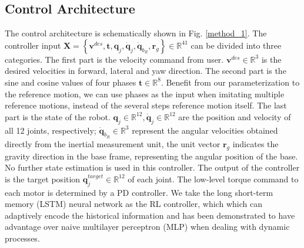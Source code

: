 \documentclass[letterpaper, 10 pt, journal, twoside]{IEEEtran} %
\begin{document}
\subsection{Control Architecture}
The control architecture is schematically shown in Fig. \ref{method_1}. The controller input $\boldsymbol{X}=\left\{\boldsymbol{v}^{des}, \boldsymbol{t}, \boldsymbol{q}_j, \dot{\boldsymbol{q}}_j, \dot{\boldsymbol{q}}_{b_R}, \boldsymbol{r}_g\right\}\in\mathbb{R}^{41}$ can be divided into three categories. The first part is the velocity command from user. $\boldsymbol{v}^{des}\in\mathbb{R}^3$ is the desired velocities in forward, lateral and yaw direction. The second part is the sine and cosine values of four phases $\boldsymbol{t}\in\mathbb{R}^8$. Benefit from our parameterization to the reference motion, we can use phases as the input when imitating multiple reference motions, instead of the several steps reference motion itself. The last part is the state of the robot. $\boldsymbol{q}_j\in\mathbb{R}^{12},\dot{\boldsymbol{q}}_j\in\mathbb{R}^{12}$ are the position and velocity of all 12 joints, respectively; $\dot{\boldsymbol{q}}_{b_R}\in\mathbb{R}^{3}$ represent the angular velocities obtained directly from the inertial measurement unit, the unit vector $\boldsymbol{r}_g$ indicates the gravity direction in the base frame, representing the angular position of the base. No further state estimation is used in this controller. The output of the controller is the target position $\boldsymbol{q}^{target}_j\in\mathbb{R}^{12}$ of each joint. The low-level torque command to each motor is determined by a PD controller. We take the long short-term memory (LSTM) neural network as the RL controller, which which can adaptively encode the historical information and has been demonstrated to have advantage over naive multilayer perceptron  (MLP) when dealing with dynamic processes\cite{siekmann2020learning}.
\end{document}
